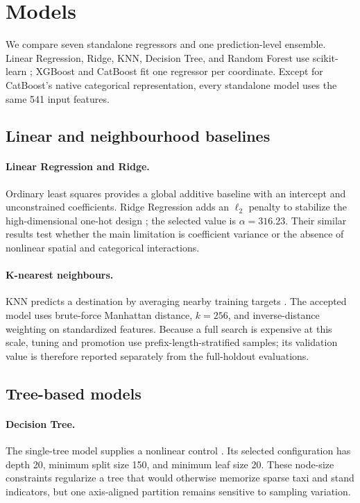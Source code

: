 \section{Models}

We compare seven standalone regressors and one prediction-level ensemble.  Linear Regression, Ridge, KNN, Decision Tree, and Random Forest use scikit-learn \citep{pedregosa2011scikit}; XGBoost and CatBoost fit one regressor per coordinate.  Except for CatBoost's native categorical representation, every standalone model uses the same 541 input features.

\subsection{Linear and neighbourhood baselines}

\paragraph{Linear Regression and Ridge.}
Ordinary least squares provides a global additive baseline with an intercept and unconstrained coefficients.  Ridge Regression adds an $\ell_2$ penalty to stabilize the high-dimensional one-hot design \citep{hoerl1970ridge}; the selected value is $\alpha=316.23$.  Their similar results test whether the main limitation is coefficient variance or the absence of nonlinear spatial and categorical interactions.

\paragraph{K-nearest neighbours.}
KNN predicts a destination by averaging nearby training targets \citep{cover1967nearest}.  The accepted model uses brute-force Manhattan distance, $k=256$, and inverse-distance weighting on standardized features.  Because a full search is expensive at this scale, tuning and promotion use prefix-length-stratified samples; its validation value is therefore reported separately from the full-holdout evaluations.

\subsection{Tree-based models}

\paragraph{Decision Tree.}
The single-tree model supplies a nonlinear control \citep{breiman1984cart}.  Its selected configuration has depth 20, minimum split size 150, and minimum leaf size 20.  These node-size constraints regularize a tree that would otherwise memorize sparse taxi and stand indicators, but one axis-aligned partition remains sensitive to sampling variation.

